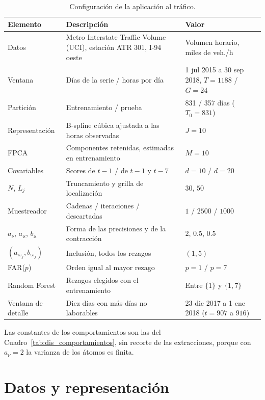 \begin{table}[H]
\centering\small
\caption{Configuración de la aplicación al tráfico.}
\label{tab:aneC_configuracion}
\begin{tabular}{p{} p{} p{}}
\hline
Elemento & Descripción & Valor \\
\hline
Datos & Metro Interstate Traffic Volume (UCI), estación ATR 301, I-94 oeste & Volumen horario, miles de veh./h \\
Ventana & Días de la serie / horas por día & 1 jul 2015 a 30 sep 2018, $T = 1188$ / $G = 24$ \\
Partición & Entrenamiento / prueba & 831 / 357 días ($T_0 = 831$) \\
Representación & B-spline cúbica ajustada a las horas observadas & $J = 10$ \\
FPCA & Componentes retenidas, estimadas en entrenamiento & $M = 10$ \\
Covariables & Scores de $t-1$ / de $t-1$ y $t-7$ & $d = 10$ / $d = 20$ \\
$N$, $L_j$ & Truncamiento y grilla de localización & $30$, $50$ \\
Muestreador & Cadenas / iteraciones / descartadas & $1$ / $2500$ / $1000$ \\
$a_\nu$, $a_\varkappa$, $b_\varkappa$ & Forma de las precisiones y de la contracción & $2$, $0.5$, $0.5$ \\
$(a_{\varpi_j}, b_{\varpi_j})$ & Inclusión, todos los rezagos & $(1, 5)$ \\
FAR($p$) & Orden igual al mayor rezago & $p = 1$ / $p = 7$ \\
Random Forest & Rezagos elegidos con el entrenamiento & Entre $\{1\}$ y $\{1,7\}$ \\
Ventana de detalle & Diez días con más días no laborables & 23 dic 2017 a 1 ene 2018 ($t = 907$ a $916$) \\
\hline
\end{tabular}
\end{table}

Las constantes de los comportamientos son las del Cuadro~\ref{tab:dis_comportamientos}, sin recorte de las extracciones, porque con $a_\nu = 2$ la varianza de los átomos es finita.

\section{Datos y representación}
\label{aneC_00_02_datos}

